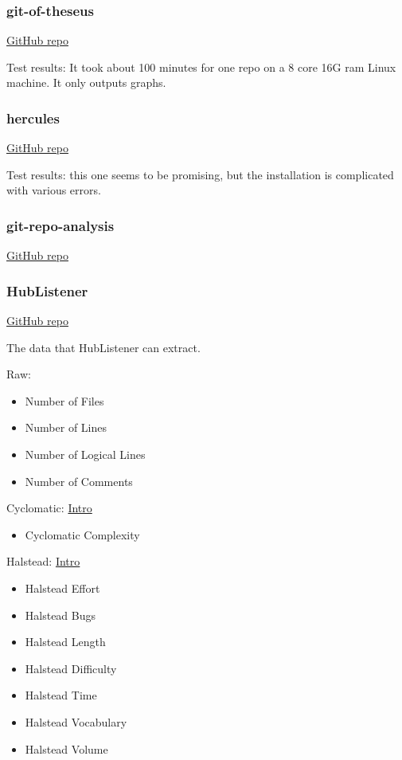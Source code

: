 \documentclass[letterpaper,cleveref]{lipics-v2019}
\theoremstyle{definition}
\begin{document}
\subsubsection{git-of-theseus}
\href{https://github.com/erikbern/git-of-theseus}{GitHub repo}

Test results: It took about 100 minutes for one repo on a 8 core 16G ram Linux
machine. It only outputs graphs.

\subsubsection{hercules}
\href{https://github.com/src-d/hercules}{GitHub repo}

Test results: this one seems to be promising, but the installation is
complicated with various errors.

\subsubsection{git-repo-analysis}
\href{https://github.com/larsxschneider/git-repo-analysis}{GitHub repo}

\subsubsection{HubListener}
\href{https://github.com/pjmc-oliveira/HubListener}{GitHub repo}

The data that HubListener can extract.

Raw:
\begin{itemize}
\item Number of Files
\item Number of Lines
\item Number of Logical Lines
\item Number of Comments
\end{itemize}

Cyclomatic:
\href{https://www.geeksforgeeks.org/cyclomatic-complexity/}{Intro}
\begin{itemize}
\item Cyclomatic Complexity
\end{itemize}
 
Halstead:
\href{https://www.geeksforgeeks.org/software-engineering-halsteads-software-metrics/}{Intro}
\begin{itemize}
\item Halstead Effort
\item Halstead Bugs
\item Halstead Length
\item Halstead Difficulty
\item Halstead Time
\item Halstead Vocabulary
\item Halstead Volume
\end{itemize}
\end{document}
